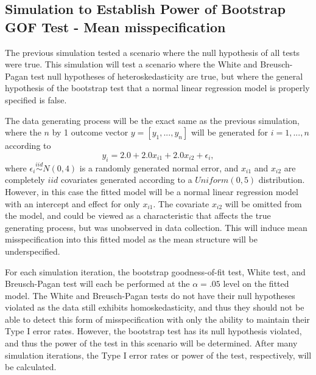 		\subsection{Simulation to Establish Power of Bootstrap GOF Test - Mean misspecification}

		The previous simulation tested a scenario where the null hypothesis of all tests were true. This simulation will test a scenario where the White and
		Breusch-Pagan test null hypotheses of heteroskedasticity are true, but where the general hypothesis of the bootstrap test that a normal linear regression model is properly
		specified is false.

		The data generating process will be the exact same as the previous simulation, where the $n$ by 1 outcome vector $y = [y_1,...,y_n]$ will be generated
		for $i = 1,...,n$ according to
		\begin{equation}
			y_i = 2.0 + 2.0 x_{i1} + 2.0 x_{i2} + \epsilon_i , 
		\end{equation}
		where $\epsilon_i \stackrel{iid}{\sim} N(0,4)$ is a randomly generated normal error, and $x_{i1}$ and $x_{i2}$ are completely $iid$ covariates generated according to
		a $Uniform(0,5)$ distribution. However, in this case the fitted model will be a normal linear regression model with an intercept and effect for only
		$x_{i1}$. The covariate $x_{i2}$ will be omitted from the model, and could be viewed as a characteristic that affects the true generating process, but
		was unobserved in data collection. This will induce mean misspecification into this fitted model as the mean structure will be underspecified.

		For each simulation iteration, the bootstrap goodness-of-fit test, White test, and Breusch-Pagan test will each be performed at the $\alpha = .05$ level on the 
		fitted model. The White and Breusch-Pagan tests do not have their null hypotheses violated as the data still exhibits homoskedasticity, and thus they should not be able to
		detect this form of misspecification with only the ability to maintain their Type I error rates. However, the bootstrap test has its null hypothesis violated,
		and thus the power of the test in this scenario will be determined. After many simulation iterations, the Type I error rates or power of the test, respectively,
		will be calculated.


